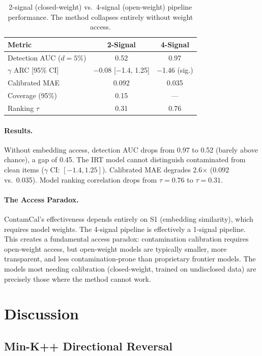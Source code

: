 \documentclass[11pt,a4paper]{article}
\begin{document}
\begin{table}[h]
\centering
\caption{2-signal (closed-weight) vs.\ 4-signal (open-weight) pipeline performance. The method collapses entirely without weight access.}
\label{tab:closed}
\begin{tabular}{lcc}
\toprule
Metric & 2-Signal & 4-Signal \\
\midrule
Detection AUC ($d=5\%$) & 0.52 & 0.97 \\
$\gamma$ ARC [95\% CI] & $-$0.08 [$-$1.4, 1.25] & $-$1.46 (sig.) \\
Calibrated MAE & 0.092 & 0.035 \\
Coverage (95\%) & 0.15 & --- \\
Ranking $\tau$ & 0.31 & 0.76 \\
\bottomrule
\end{tabular}
\end{table}

\paragraph{Results.} Without embedding access, detection AUC drops from 0.97 to 0.52 (barely above chance), a gap of 0.45. The IRT model cannot distinguish contaminated from clean items ($\gamma$ CI: $[-1.4, 1.25]$). Calibrated MAE degrades 2.6$\times$ (0.092 vs.\ 0.035). Model ranking correlation drops from $\tau = 0.76$ to $\tau = 0.31$.

\paragraph{The Access Paradox.} ContamCal's effectiveness depends entirely on S1 (embedding similarity), which requires model weights. The 4-signal pipeline is effectively a 1-signal pipeline. This creates a fundamental access paradox: contamination calibration requires open-weight access, but open-weight models are typically smaller, more transparent, and less contamination-prone than proprietary frontier models. The models most needing calibration (closed-weight, trained on undisclosed data) are precisely those where the method cannot work.

\section{Discussion}

\subsection{Min-K++ Directional Reversal}
\end{document}
